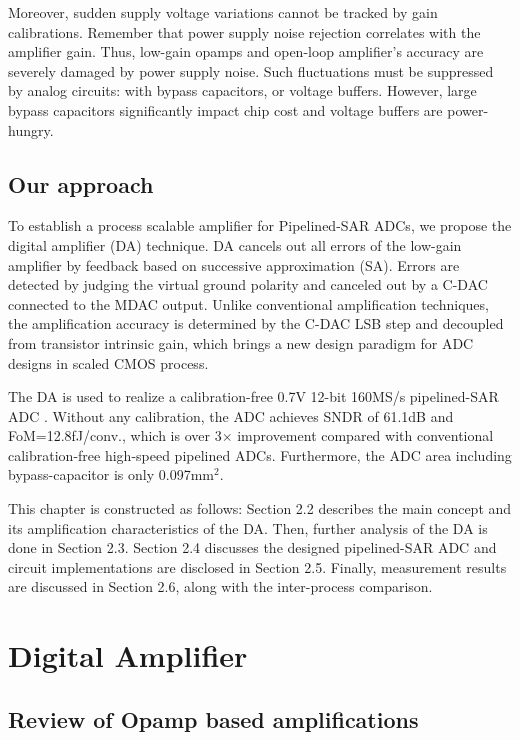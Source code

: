 Moreover, sudden supply voltage variations cannot be tracked by gain calibrations. Remember that power supply noise rejection correlates with the amplifier gain. Thus, low-gain opamps and open-loop amplifier's accuracy are severely damaged by power supply noise.
Such fluctuations must be suppressed by analog circuits: with bypass capacitors, or voltage buffers. However, large bypass capacitors significantly impact chip cost and voltage buffers are power-hungry.
\color{black}

\subsection{Our approach}
To establish a process scalable amplifier for Pipelined-SAR ADCs, we propose the digital amplifier (DA) technique. 
DA cancels out all errors of the low-gain amplifier by feedback based on successive approximation (SA). Errors are detected by judging the virtual ground polarity and canceled out by a C-DAC connected to the MDAC output. Unlike conventional amplification techniques, the amplification accuracy is determined by the C-DAC LSB step and decoupled from transistor intrinsic gain, which brings a new design paradigm for ADC designs in scaled CMOS process. 

The DA is used to realize a calibration-free 0.7V 12-bit 160MS/s pipelined-SAR ADC \cite{yoshioka201728} \cite{yoshioka-digitalamp-journal}. Without any calibration, the ADC achieves SNDR of 61.1dB and FoM=12.8fJ/conv., which is over 3$\times$ improvement compared with conventional calibration-free high-speed pipelined ADCs. Furthermore, the ADC area including bypass-capacitor is only 0.097mm$^2$. 

This chapter is constructed as follows: Section 2.2 describes the main concept and its amplification characteristics of the DA. Then, further analysis of the DA is done in Section 2.3. Section 2.4 discusses the designed pipelined-SAR ADC and circuit implementations are disclosed in Section 2.5. Finally, measurement results are discussed in Section 2.6, along with the inter-process comparison.


\section{Digital Amplifier}
\subsection{Review of Opamp based amplifications}

